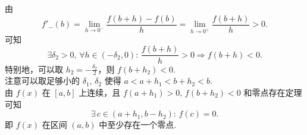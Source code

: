\begin{enumerate}
\begin{solution}
        由
        \[
        f'_-(b)=\lim_{h\to 0^-}\frac{f(b+h)-f(b)}{h}=\lim_{h\to 0^+}\frac{f(b+h)}{h}>0.
        \]
        可知
        \[
        \exists \delta_{2}>0,\,\forall h\in(-\delta_{2},0):\,\frac{f(b+h)}{h}>0\Rightarrow f(b+h)<0.
        \]
        特别地，可以取 $\displaystyle h_{2}=-\frac{\delta_{2}}{2}$，则 $f(b+h_{2})<0$.\\
        注意可以取足够小的 $\delta_{1},\,\delta_{2}$ 使得 $a<a+h_{1}<b+h_{2}<b$.\\
        由 $f(x)$ 在 $[a,b]$ 上连续，且 $f(a+h_{1})>0,\,f(b+h_{2})<0$ 和零点存在定理可知
        \[
        \exists \,c\in(a+h_{1},b-h_{2}):\,f(c)=0.
        \]
        即 $f(x)$ 在区间 $(a,b)$ 中至少存在一个零点.
    \end{solution}
\end{enumerate}